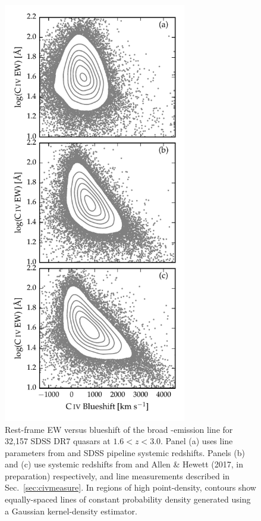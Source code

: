 \begin{figure}
    \centering 
    \includegraphics[width=8cm]{figures/chapter03/civ_space_z_compare.pdf}
    \caption[{Rest-frame EW versus blueshift of the broad -emission line for 32,157 SDSS DR7 quasars at $1.6 < z < 3.0$.}]{Rest-frame EW versus blueshift of the broad -emission line for 32,157 SDSS DR7 quasars at $1.6 < z < 3.0$. Panel (a) uses  line parameters from \citet{shen11} and SDSS pipeline systemic redshifts. Panels (b) and (c) use systemic redshifts from \citet{hewett10} and Allen \& Hewett (2017, in preparation) respectively, and  line measurements described in Sec.~\ref{sec:civmeasure}. In regions of high point-density, contours show equally-spaced lines of constant probability density generated using a Gaussian kernel-density estimator.} 
    \label{fig:civ_space_z_compare}
\end{figure}

